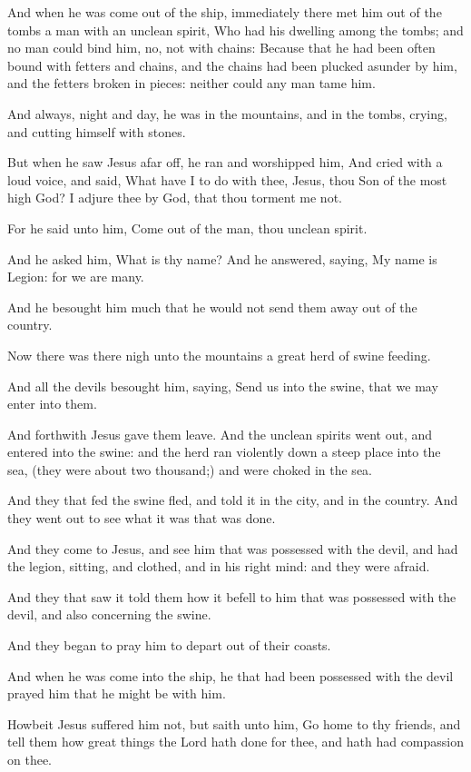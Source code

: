 \Verse And when he was come out of the ship, immediately there met him out of the tombs a man with an unclean spirit, \Verse Who had his dwelling among the tombs; and no man could bind him, no, not with chains: \Verse Because that he had been often bound with fetters and chains, and the chains had been plucked asunder by him, and the fetters broken in pieces: neither could any man tame him.

\Verse And always, night and day, he was in the mountains, and in the tombs, crying, and cutting himself with stones.

\Verse But when he saw Jesus afar off, he ran and worshipped him, \Verse And cried with a loud voice, and said, What have I to do with thee, Jesus, thou Son of the most high God? I adjure thee by God, that thou torment me not.

\Verse For he said unto him, Come out of the man, thou unclean spirit.

\Verse And he asked him, What is thy name? And he answered, saying, My name is Legion: for we are many.

\Verse And he besought him much that he would not send them away out of the country.

\Verse Now there was there nigh unto the mountains a great herd of swine feeding.

\Verse And all the devils besought him, saying, Send us into the swine, that we may enter into them.

\Verse And forthwith Jesus gave them leave. And the unclean spirits went out, and entered into the swine: and the herd ran violently down a steep place into the sea, (they were about two thousand;) and were choked in the sea.

\Verse And they that fed the swine fled, and told it in the city, and in the country. And they went out to see what it was that was done.

\Verse And they come to Jesus, and see him that was possessed with the devil, and had the legion, sitting, and clothed, and in his right mind: and they were afraid.

\Verse And they that saw it told them how it befell to him that was possessed with the devil, and also concerning the swine.

\Verse And they began to pray him to depart out of their coasts.

\Verse And when he was come into the ship, he that had been possessed with the devil prayed him that he might be with him.

\Verse Howbeit Jesus suffered him not, but saith unto him, Go home to thy friends, and tell them how great things the Lord hath done for thee, and hath had compassion on thee.

